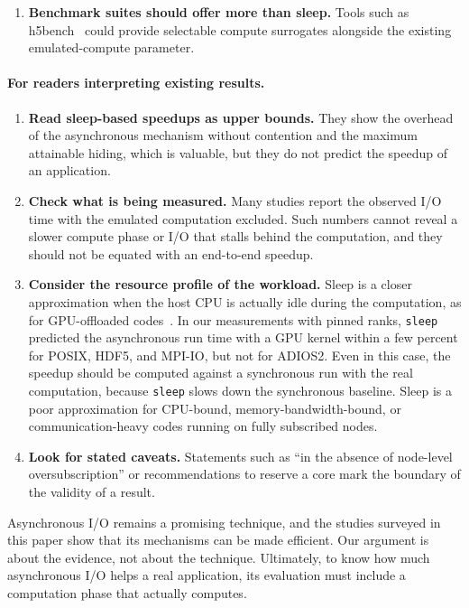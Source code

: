 \begin{enumerate}
{        baseline.} I/O time can vary considerably between runs, as it did on
        our node, and a single synchronous run can inflate or deflate a
        speedup. In addition, \texttt{sleep} itself slowed down the
        synchronous I/O in our measurements, by \RecheckMinPct\% to
        \RecheckMaxPct\%, which inflates \texttt{sleep}-based speedups
        further. Comparing asynchronous runs directly, as we do, reduces
        this sensitivity.
  \item \textbf{Benchmark suites should offer more than sleep.} Tools such as
        h5bench~\cite{li2021h5bench} could provide selectable compute
        surrogates alongside the existing emulated-compute parameter.
\end{enumerate}

\paragraph{For readers interpreting existing results.}
\begin{enumerate}
  \item \textbf{Read sleep-based speedups as upper bounds.} They show the
        overhead of the asynchronous mechanism without contention and the
        maximum attainable hiding, which is valuable, but they do not
        predict the speedup of an application.
  \item \textbf{Check what is being measured.} Many studies report the
        observed I/O time with the emulated computation excluded. Such
        numbers cannot reveal a slower compute phase or I/O that stalls
        behind the computation, and they should not be equated with an
        end-to-end speedup.
  \item \textbf{Consider the resource profile of the workload.} Sleep is a
        closer approximation when the host CPU is actually idle during the
        computation, as for GPU-offloaded codes~\cite{tang2022async}. In our
        measurements with pinned ranks, \texttt{sleep} predicted the
        asynchronous run time with a GPU kernel within a few percent for
        POSIX, HDF5, and MPI-IO, but not for ADIOS2. Even in this case, the
        speedup should be computed against a synchronous run with the real
        computation, because \texttt{sleep} slows down the synchronous
        baseline. Sleep is a poor approximation for CPU-bound,
        memory-bandwidth-bound, or communication-heavy codes running on fully
        subscribed nodes.
  \item \textbf{Look for stated caveats.} Statements such as ``in the absence
        of node-level oversubscription'' or recommendations to reserve a core
        mark the boundary of the validity of a result.
\end{enumerate}

Asynchronous I/O remains a promising technique, and the studies surveyed in
this paper show that its mechanisms can be made efficient. Our argument is
about the evidence, not about the technique. Ultimately, to know how much
asynchronous I/O helps a real application, its evaluation must include a
computation phase that actually computes.
